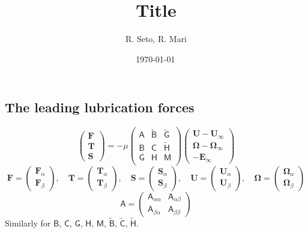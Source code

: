 \documentclass[12pt]{article}
\title{Title}
\date{\shortdate\today \, \ampmtime }
\author{R. Seto, R. Mari}
\newcommand{\tens}[1]{\bm{\mathsf{#1}}}
\begin{document}
\maketitle


\subsection*{The leading lubrication forces}

\begin{equation}
 \begin{pmatrix}
  \bm{F} \\ \bm{T} \\ \bm{S}
 \end{pmatrix}
 =
- \mu
\begin{pmatrix}
 \tens{A} &  \tilde{\tens{B}} &  \tilde{\tens{G}} \\
 \tens{B} &  \tens{C} &  \tilde{\tens{H}} \\
 \tens{G} &  \tens{H} &  \tens{M} \\
\end{pmatrix}
 \begin{pmatrix}
  \bm{U}-\bm{U}_{\infty} \\ \bm{\Omega} - \bm{\Omega}_{\infty}
 \\ -\bm{E}_{\infty}
 \end{pmatrix}
\end{equation}
\begin{equation}
 \bm{F}
= 
\begin{pmatrix}
 \bm{F}_\alpha \\  \bm{F}_\beta
\end{pmatrix}
,\quad
 \bm{T}
= 
\begin{pmatrix}
 \bm{T}_\alpha \\  \bm{T}_\beta
\end{pmatrix}
,\quad
 \bm{S}
= 
\begin{pmatrix}
 \bm{S}_\alpha \\  \bm{S}_\beta
\end{pmatrix}
,\quad
 \bm{U}
= 
\begin{pmatrix}
 \bm{U}_\alpha \\  \bm{U}_\beta
\end{pmatrix}
,\quad
 \bm{\Omega}
= 
\begin{pmatrix}
 \bm{\Omega}_\alpha \\  \bm{\Omega}_\beta
\end{pmatrix}
\end{equation}
\begin{equation}
 \tens{A}
 =
\begin{pmatrix}
  \tens{A}_{\alpha\alpha} & \tens{A}_{\alpha\beta} \\
  \tens{A}_{\beta\alpha} & \tens{A}_{\beta\beta} 
\end{pmatrix}
\end{equation}
Similarly for 
$\tens{B}$, $\tens{C}$, $\tens{G}$,
$\tens{H}$, $\tens{M}$, 
$\tilde{\tens{B}}$, $\tilde{\tens{C}}$, $\tilde{\tens{H}}$.
%
\end{document}
